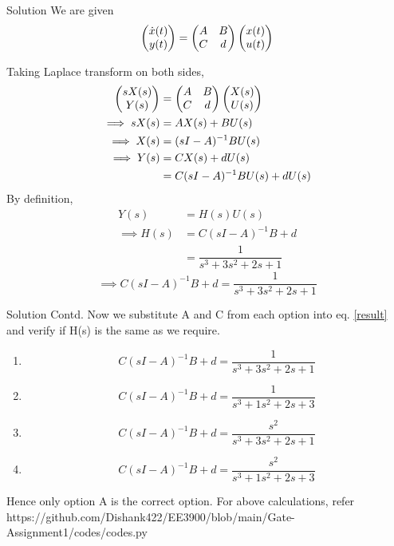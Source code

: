 \documentclass[9pt]{beamer}
\begin{document}
\begin{frame}{Solution}
    We are given 
\begin{equation}
    \begin{pmatrix}\dot{x}(t)\\y(t)\end{pmatrix} = \begin{pmatrix}A & B\\C & d\end{pmatrix}\begin{pmatrix}x(t)\\u(t)\end{pmatrix}
\end{equation}
    
Taking Laplace transform on both sides,
\begin{align}
    \begin{pmatrix}sX(s)\\Y(s)\end{pmatrix} &= \begin{pmatrix}A & B\\ C & d\end{pmatrix}\begin{pmatrix}X(s)\\U(s)\end{pmatrix}\\
    \implies sX(s) &= AX(s)+BU(s)\\
    \implies X(s) &= (sI-A)^{-1} BU(s)\\
    \implies Y(s) &= CX(s)+dU(s)\\ 
                  &= C(sI-A)^{-1} BU(s) +dU(s)
\end{align}
By definition, 
\begin{align}
    Y(s) &= H(s)U(s)\\
    \implies H(s) &= C(sI-A)^{-1} B + d\\
                  &= \dfrac{1}{s^3+3s^2+2s+1}
\end{align} 
\begin{equation}
    \implies C(sI-A)^{-1} B + d = \dfrac{1}{s^3+3s^2+2s+1}\label{result}
\end{equation}

\end{frame}

\begin{frame}{Solution Contd.}
    Now we substitute A and C from each option into eq. \ref{result} and verify if H(s) is the same as we require. 
\begin{enumerate}[A]
    \item \begin{equation}
        C(sI-A)^{-1} B +d = \dfrac{1}{s^3+3s^2+2s+1}
    \end{equation}
    \item \begin{equation}
        C(sI-A)^{-1} B +d = \dfrac{1}{s^3+1s^2+2s+3}
    \end{equation}    
    \item \begin{equation}
        C(sI-A)^{-1} B +d = \dfrac{s^2}{s^3+3s^2+2s+1}
    \end{equation}
    \item \begin{equation}
        C(sI-A)^{-1} B +d = \dfrac{s^2}{s^3+1s^2+2s+3}
    \end{equation}
\end{enumerate}

Hence only option A is the correct option. For above calculations, refer https://github.com/Dishank422/EE3900/blob/main/Gate-Assignment1/codes/codes.py
\end{frame}
\end{document}
